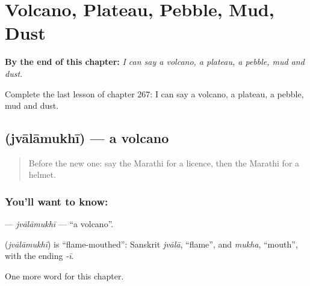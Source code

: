 
\chapter{Volcano, Plateau, Pebble, Mud, Dust}
\label{ch:mr-volcano-plateau-pebble-mud-dust}

\begin{chapteropening}
\textbf{By the end of this chapter:} \emph{I can say a volcano, a plateau, a pebble, mud and dust.}

Complete the last lesson of chapter 267: I can say a volcano, a plateau, a pebble, mud and dust.
\end{chapteropening}

\section[\texorpdfstring{\mr{ज्वालामुखी} (jvālāmukhī)}{ज्वालामुखी (jvālāmukhī)}]{ (jvālāmukhī) — a volcano}

\label{lesson:MR-C267-jvalamukhi}



\begin{quote}
Before the new one: say the Marathi for a licence, then the Marathi for a helmet.
\end{quote}

\subsection*{You'll want to know: }
\textbf{} — \emph{jvālāmukhī} — \textquotedblleft{}a volcano\textquotedblright{}.

\begin{cousinweb}
\textbf{} (\emph{jvālāmukhī}) is \textquotedblleft{}flame-mouthed\textquotedblright{}: Sanskrit \emph{jvālā}, \textquotedblleft{}flame\textquotedblright{}, and \emph{mukha}, \textquotedblleft{}mouth\textquotedblright{}, with the ending \emph{-ī}.
\end{cousinweb}

\begin{grammarlens}[title={What you've built}]
One more word for this chapter.
\end{grammarlens}

